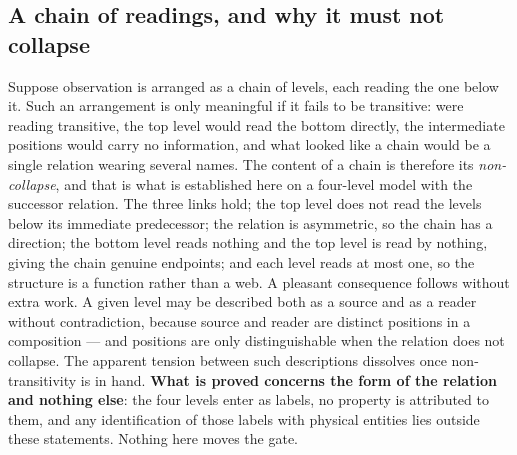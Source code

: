 \documentclass[11pt]{article}
\theoremstyle{definition}\newtheorem{deriv}{Derivation}
\begin{document}
\subsection*{A chain of readings, and why it must not collapse}Suppose observation is arranged as a chain of levels, each reading the one below it. Such an arrangement is only meaningful if it fails to be transitive: were reading transitive, the top level would read the bottom directly, the intermediate positions would carry no information, and what looked like a chain would be a single relation wearing several names. The content of a chain is therefore its \emph{non-collapse}, and that is what is established here on a four-level model with the successor relation. The three links hold; the top level does not read the levels below its immediate predecessor; the relation is asymmetric, so the chain has a direction; the bottom level reads nothing and the top level is read by nothing, giving the chain genuine endpoints; and each level reads at most one, so the structure is a function rather than a web. A pleasant consequence follows without extra work. A given level may be described both as a source and as a reader without contradiction, because source and reader are distinct positions in a composition --- and positions are only distinguishable when the relation does not collapse. The apparent tension between such descriptions dissolves once non-transitivity is in hand. \textbf{What is proved concerns the form of the relation and nothing else}: the four levels enter as labels, no property is attributed to them, and any identification of those labels with physical entities lies outside these statements. Nothing here moves the gate.
\end{document}
